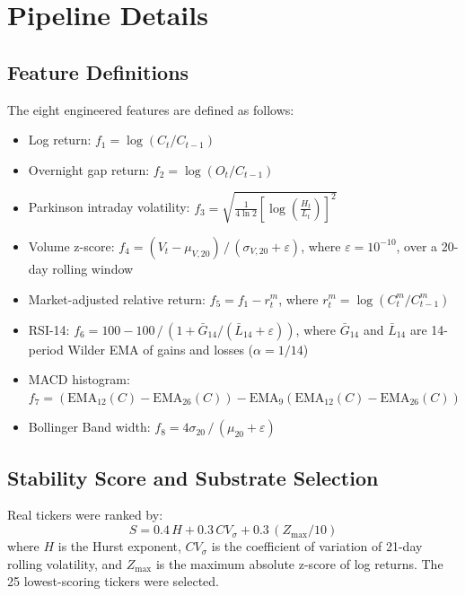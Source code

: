 \documentclass{llncs}
\begin{document}
\section{Pipeline Details}
\label{app:methodology}

\subsection*{Feature Definitions}

The eight engineered features are defined as follows:
\begin{itemize}
    \item Log return: $f_1 = \log(C_t/C_{t-1})$
    \item Overnight gap return: $f_2 = \log(O_t/C_{t-1})$
    \item Parkinson intraday volatility: $f_3 = \sqrt{\frac{1}{4\ln 2}\left[\log\left(\frac{H_t}{L_t}\right)\right]^2}$
    \item Volume z-score: $f_4 = (V_t - \mu_{V,20})\,/\,(\sigma_{V,20} + \varepsilon)$, where $\varepsilon = 10^{-10}$, over a 20-day rolling window
    \item Market-adjusted relative return: $f_5 = f_1 - r_t^m$, where $r_t^m = \log(C_t^m / C_{t-1}^m)$
    \item RSI-14: $f_6 = 100 - 100\,/\,(1 + \bar{G}_{14}/(\bar{L}_{14} + \varepsilon))$, where $\bar{G}_{14}$ and $\bar{L}_{14}$ are 14-period Wilder EMA of gains and losses ($\alpha = 1/14$)
    \item MACD histogram: $f_7 = (\mathrm{EMA}_{12}(C) - \mathrm{EMA}_{26}(C)) - \mathrm{EMA}_{9}(\mathrm{EMA}_{12}(C) - \mathrm{EMA}_{26}(C))$
    \item Bollinger Band width: $f_8 = 4\sigma_{20}\,/\,(\mu_{20} + \varepsilon)$
\end{itemize}

\subsection*{Stability Score and Substrate Selection}

Real tickers were ranked by:
\begin{equation}
S = 0.4\,H + 0.3\,CV_{\sigma} + 0.3\,(Z_{\max}/10)
\end{equation}
where $H$ is the Hurst exponent, $CV_{\sigma}$ is the coefficient of variation of 21-day rolling volatility, and $Z_{\max}$ is the maximum absolute z-score of log returns. The 25 lowest-scoring tickers were selected.
\end{document}
